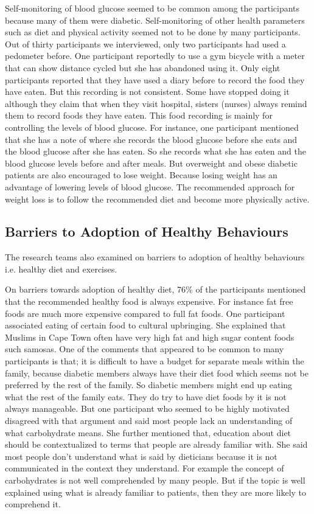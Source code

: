 Self-monitoring of blood glucose seemed to be common among the participants because many of them were diabetic. Self-monitoring of other health parameters such as diet and physical activity seemed not to be done by many participants. Out of thirty participants we interviewed, only two participants had used a pedometer before.  One participant reportedly to use a gym bicycle with a meter that can show distance cycled but she has abandoned using it. Only eight participants reported that they have used a diary before to record the food they have eaten. But this recording is not consistent. Some have stopped doing it although they claim that when they visit hospital, sisters (nurses) always remind them to record foods they have eaten. This food recording is mainly for controlling the levels of blood glucose. For instance, one participant mentioned that she has a note of where she records the blood glucose before she eats and the blood glucose after she has eaten. So she records what she has eaten and the blood glucose levels before and after meals. But overweight and obese diabetic patients are also encouraged to lose weight. Because losing weight has an advantage of lowering levels of blood glucose.  The recommended approach for weight loss is to follow the recommended diet and become more physically active. 
\subsection{Barriers to Adoption of Healthy Behaviours}
The research teams also examined on barriers to adoption of healthy behaviours i.e. healthy diet and exercises.

On barriers towards adoption of healthy diet, 76\% of the participants mentioned that the recommended healthy food is always expensive. For instance fat free foods are much more expensive compared to full fat foods. One participant associated eating of certain food to cultural upbringing. She explained that Muslims in Cape Town often have very high fat and high sugar content foods  such samosas. One of the comments that appeared to be common to many participants is that; it is difficult to have a budget for separate meals within the family, because diabetic members always have their diet food which seems not be preferred by the rest of the family. So diabetic members might end up eating what the rest of the family eats. They do try to have diet foods by it is not always manageable. But one participant who seemed to be highly motivated disagreed with that argument and said most people lack an understanding of what carbohydrate means. She further mentioned that, education about diet should be contextualized to terms that people are already familiar with. She said most people don't understand what is said by dieticians because it is not communicated in the context they understand. For example the concept of carbohydrates is not well comprehended by many people. But if the topic is well explained using what is already familiar to patients, then they are more likely to comprehend it.


